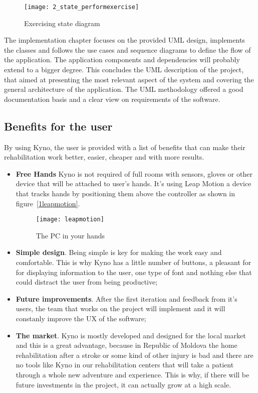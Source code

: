 \begin{figure}[!h]
\centering
\texttt{[image: 2\_state\_performexercise]}
\caption{Exercising state diagram}\label{state_perform}
\end{figure}

The implementation chapter focuses on the provided UML design, implements the classes and follows the use cases and sequence diagrams to define the flow of the application. The application components and dependencies will probably extend to a bigger degree. This concludes the UML description of the project, that aimed at presenting the most relevant aspect of the system and covering the general architecture of the application. The UML methodology offered a good documentation basis and a clear view on requirements of the software.

\subsection{Benefits for the user}



By using Kyno, the user is provided with a list of benefits that can make their rehabilitation work better, easier, cheaper and with more results.

\begin{itemize}
\item \textbf{Free Hands} Kyno is not required of full rooms with sensors, gloves or other device that will be attached to user's hands. It's using Leap Motion a device that tracks hands by positioning them above the controller as shown in \mbox{figure \ref{1leapmotion}}.

\begin{figure}[!h]
\centering
\texttt{[image: leapmotion]}
\caption{The PC in your hands \cite{leap}}\label{1leapmotion]}
\end{figure}


\item \textbf{Simple design}. Being simple is key for making the work easy and comfortable. This is why Kyno has a little number of buttons, a pleasant for for displaying information to the user, one type of font and nothing else that could distract the user from being productive;

\item \textbf{Future improvements}. After the first iteration and feedback from it's users, the team that works on the project will implement and it will constanly improve the UX of the software;

\item \textbf{The market}. Kyno is mostly developed and designed for the local market and this is a great advantage, because in Republic of Moldova the home rehabilitation after a stroke or some kind of other injury is bad and there are no tools like Kyno in our rehabilitation centers that will take a patient through a whole new adventure and experience. This is why, if there will be future investments in the project, it can actually grow at a high scale.
\end{itemize}

\clearpage
